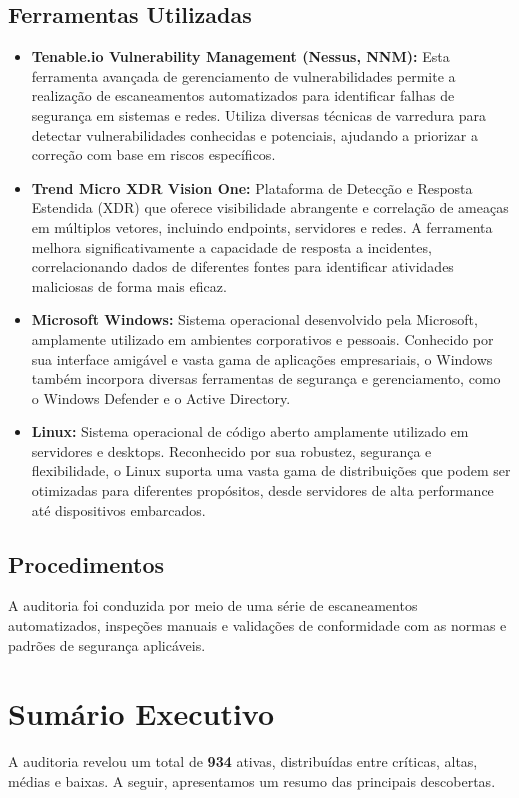 \documentclass[a4paper,12pt]{article}
\begin{document}
\subsection{Ferramentas Utilizadas}
\begin{itemize}
    \item \textbf{Tenable.io Vulnerability Management (Nessus, NNM):} Esta ferramenta avançada de gerenciamento de vulnerabilidades permite a realização de escaneamentos automatizados para identificar falhas de segurança em sistemas e redes. Utiliza diversas técnicas de varredura para detectar vulnerabilidades conhecidas e potenciais, ajudando a priorizar a correção com base em riscos específicos.
    \item \textbf{Trend Micro XDR Vision One:} Plataforma de Detecção e Resposta Estendida (XDR) que oferece visibilidade abrangente e correlação de ameaças em múltiplos vetores, incluindo endpoints, servidores e redes. A ferramenta melhora significativamente a capacidade de resposta a incidentes, correlacionando dados de diferentes fontes para identificar atividades maliciosas de forma mais eficaz.
    \item \textbf{Microsoft Windows:} Sistema operacional desenvolvido pela Microsoft, amplamente utilizado em ambientes corporativos e pessoais. Conhecido por sua interface amigável e vasta gama de aplicações empresariais, o Windows também incorpora diversas ferramentas de segurança e gerenciamento, como o Windows Defender e o Active Directory.
    \item \textbf{Linux:} Sistema operacional de código aberto amplamente utilizado em servidores e desktops. Reconhecido por sua robustez, segurança e flexibilidade, o Linux suporta uma vasta gama de distribuições que podem ser otimizadas para diferentes propósitos, desde servidores de alta performance até dispositivos embarcados.
\end{itemize}

\subsection{Procedimentos}
A auditoria foi conduzida por meio de uma série de escaneamentos automatizados, inspeções manuais e validações de conformidade com as normas e padrões de segurança aplicáveis.

\section{Sumário Executivo}
A auditoria revelou um total de \textbf{934} ativas, distribuídas entre críticas, altas, médias e baixas. A seguir, apresentamos um resumo das principais descobertas.
\end{document}
